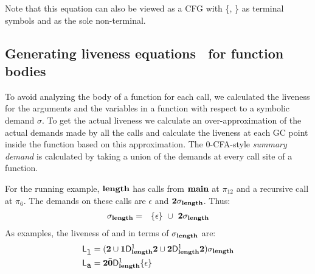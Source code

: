 \documentclass[preprint, 9pt]{sigplanconf}
\begin{document}
Note that this equation can also be viewed as a CFG with \{\acdr,
\clazy\} as terminal symbols and  as the sole
non-terminal.

\subsection{Generating liveness equations \Lv\  for function bodies}
\label{sec:bodylivenessbodies}

To  avoid analyzing  the body  of a  function for  each
call, we calculated the  liveness for the arguments and
the variables in a function  with respect to a symbolic
demand  $\sigma$.   To  get   the  actual  liveness  we
calculate an  over-approximation of the  actual demands
made by  all the  calls and  calculate the  liveness at
each  GC  point  inside  the  function  based  on  this
approximation.  The 0-CFA-style {\em summary demand} is
calculated by  taking a union  of the demands  at every
call site of a function.



For  the  running  example,   $\mathbf{length}$  has  calls  from  $\mathbf{main}$  at
$\pi_{12}$ and a recursive call at $\pi_6$. The demands on these calls
are $\epsilon$ and ${\mathbf{2}}\sigma_{\mathit{\mathbf{length}}}$. Thus:
\begin{eqnarray*}
\sigma_{\mathbf{length}}    &=&
 \{\epsilon\}  ~\cup~{{\mathbf{2}}\sigma_{\mathit{\mathbf{length}}}}
\end{eqnarray*}
As examples, the liveness of \Lanv{\pl}{} and \Lanv{\pa}{} in terms
of  $\sigma_{\mathbf{length}}$ are:
\begin{align*}
\mathsf{L}_{{\mbox{\tt l}}}^{} &= ({\mathbf{2}} \cup \mathbf{1}\mathsf{D}_{\mathit {\mathbf{length}}}^{1}{\mathbf{2}}
  \cup {\mathbf{2}}\mathsf{D}_{\mathit {\mathbf{length}}}^{1}{{\mathbf{2}}})\sigma_{\mathit{\mathbf{length}}}
 \\
\mathsf{L}_{{\mbox{\tt a}}}^{} &= {\mathbf{2}} \bar{\mathbf{0}} \mathsf{D}_{\mathit {\mathbf{length}}}^{1}\{\epsilon\}
\end{align*}
\end{document}

